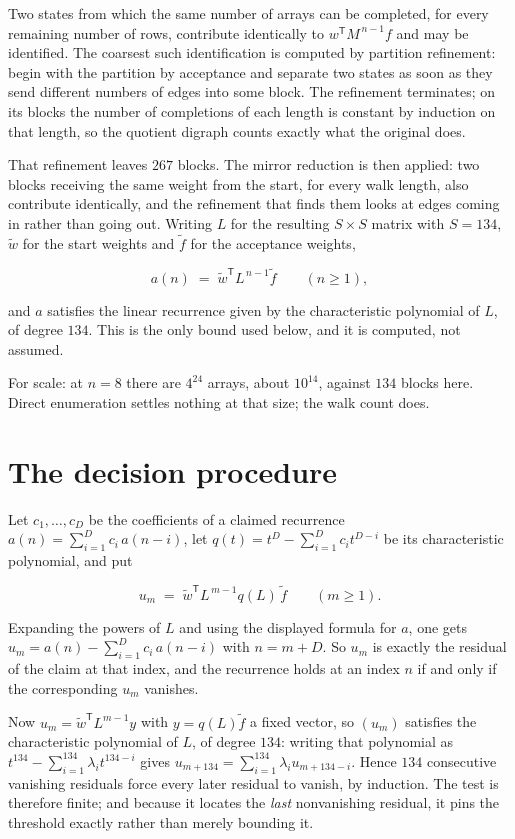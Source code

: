 \documentclass[11pt]{article}
\theoremstyle{definition}
\begin{document}
Two states from which the same number of arrays can be completed, for every remaining number of rows, contribute identically to $w^{\mathsf T}M^{\,n-1}f$ and may be identified. The coarsest such identification is computed by partition refinement: begin with the partition by acceptance and separate two states as soon as they send different numbers of edges into some block. The refinement terminates; on its blocks the number of completions of each length is constant by induction on that length, so the quotient digraph counts exactly what the original does.

That refinement leaves $267$ blocks. The mirror reduction is then applied: two blocks receiving the same weight from the start, for every walk length, also contribute identically, and the refinement that finds them looks at edges coming in rather than going out. Writing $L$ for the resulting $S \times S$ matrix with $S = 134$, $\tilde w$ for the start weights and $\tilde f$ for the acceptance weights,

\[a(n) \;=\; \tilde w^{\mathsf T} L^{\,n-1} \tilde f \qquad (n \ge 1),\]

and $a$ satisfies the linear recurrence given by the characteristic polynomial of $L$, of degree $134$. This is the only bound used below, and it is computed, not assumed.

For scale: at $n = 8$ there are $4^{24}$ arrays, about $10^{14}$, against $134$ blocks here. Direct enumeration settles nothing at that size; the walk count does.

\section{The decision procedure}

Let $c_1,\dots,c_D$ be the coefficients of a claimed recurrence $a(n) = \sum_{i=1}^{D} c_i\,a(n-i)$, let $q(t) = t^{D} - \sum_{i=1}^{D} c_i t^{D-i}$ be its characteristic polynomial, and put

\[u_m \;=\; \tilde w^{\mathsf T} L^{\,m-1} q(L)\,\tilde f \qquad (m \ge 1).\]

Expanding the powers of $L$ and using the displayed formula for $a$, one gets $u_m = a(n) - \sum_{i=1}^{D} c_i\,a(n-i)$ with $n = m + D$. So $u_m$ is exactly the residual of the claim at that index, and the recurrence holds at an index $n$ if and only if the corresponding $u_m$ vanishes.

Now $u_m = \tilde w^{\mathsf T} L^{m-1} y$ with $y = q(L)\tilde f$ a fixed vector, so $(u_m)$ satisfies the characteristic polynomial of $L$, of degree $134$: writing that polynomial as $t^{134} - \sum_{i=1}^{134} \lambda_i t^{134-i}$ gives $u_{m+134} = \sum_{i=1}^{134} \lambda_i u_{m+134-i}$. Hence $134$ consecutive vanishing residuals force every later residual to vanish, by induction. The test is therefore finite; and because it locates the {\itshape last} nonvanishing residual, it pins the threshold exactly rather than merely bounding it.
\end{document}
